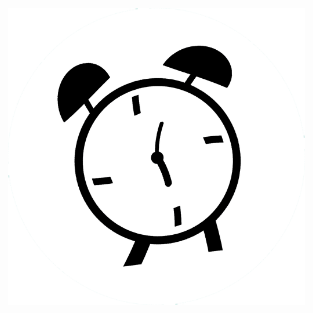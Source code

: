 \documentclass[a6paper,10pt,twoside]{article}
\begin{document}
\vspace{20pt}
\begin{figure}[!h]
\hspace{30pt}
\includegraphics[width=0.70\textwidth]{klocka.png}
\end{figure}
\end{document}
